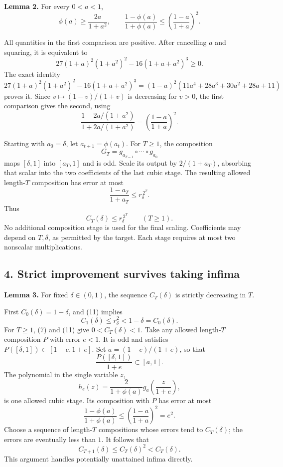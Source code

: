\documentclass[10pt,a4paper]{article}
\begin{document}
\textbf{Lemma 2.} For every \(0<a<1\), \[
\phi(a)\ge\frac{2a}{1+a^2},\qquad
\frac{1-\phi(a)}{1+\phi(a)}
\le \left(\frac{1-a}{1+a}\right)^2.
\tag{9}
\]

All quantities in the first comparison are positive. After cancelling
\(a\) and squaring, it is equivalent to \[
27(1+a)^2(1+a^2)^2-16(1+a+a^2)^3\ge0.
\] The exact identity \[
27(1+a)^2(1+a^2)^2-16(1+a+a^2)^3
=(1-a)^2(11a^4+28a^3+30a^2+28a+11)
\tag{10}
\] proves it. Since \(v\mapsto(1-v)/(1+v)\) is decreasing for \(v>0\),
the first comparison gives the second, using \[
\frac{1-2a/(1+a^2)}{1+2a/(1+a^2)}
=\left(\frac{1-a}{1+a}\right)^2.
\]

Starting with \(a_0=\delta\), let \(a_{t+1}=\phi(a_t)\). For \(T\ge1\),
the composition \[
G_T=g_{a_{T-1}}\circ\cdots\circ g_{a_0}
\] maps \([\delta,1]\) into \([a_T,1]\) and is odd. Scale its output by
\(2/(1+a_T)\), absorbing that scalar into the two coefficients of the
last cubic stage. The resulting allowed length-\(T\) composition has
error at most \[
\frac{1-a_T}{1+a_T}\le r_\delta^{\,2^T}.
\] Thus \[
C_T(\delta)\le r_\delta^{\,2^T}\qquad(T\ge1).
\tag{11}
\] No additional composition stage is used for the final scaling.
Coefficients may depend on \(T,\delta\), as permitted by the target.
Each stage requires at most two nonscalar multiplications.


\subsection{4. Strict improvement survives taking
infima}\label{strict-improvement-survives-taking-infima}

\textbf{Lemma 3.} For fixed \(\delta\in(0,1)\), the sequence
\(C_T(\delta)\) is strictly decreasing in \(T\).

First \(C_0(\delta)=1-\delta\), and (11) implies \[
C_1(\delta)\le r_\delta^2<1-\delta=C_0(\delta).
\tag{12}
\] For \(T\ge1\), (7) and (11) give \(0<C_T(\delta)<1\). Take any
allowed length-\(T\) composition \(P\) with error \(e<1\). It is odd and
satisfies \(P([\delta,1])\subset[1-e,1+e]\). Set \(a=(1-e)/(1+e)\), so
that \[
\frac{P([\delta,1])}{1+e}\subset[a,1].
\] The polynomial in the single variable \(z\), \[
h_e(z)=\frac{2}{1+\phi(a)}
       g_a\!\left(\frac{z}{1+e}\right),
\] is one allowed cubic stage. Its composition with \(P\) has error at
most \[
\frac{1-\phi(a)}{1+\phi(a)}
\le\left(\frac{1-a}{1+a}\right)^2=e^2.
\] Choose a sequence of length-\(T\) compositions whose errors tend to
\(C_T(\delta)\); the errors are eventually less than \(1\). It follows
that \[
C_{T+1}(\delta)\le C_T(\delta)^2<C_T(\delta).
\tag{13}
\] This argument handles potentially unattained infima directly.
\end{document}
